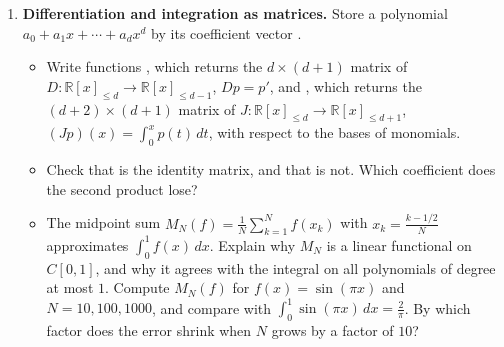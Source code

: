 \begin{enumerate}[label=\textbf{P\arabic*.}, leftmargin=*]
    \item \textbf{Differentiation and integration as matrices.} Store a polynomial $a_0 + a_1x + \cdots + a_dx^d$ by its coefficient vector .
    \begin{itemize}
        \item Write functions , which returns the $d \times (d + 1)$ matrix of $D: \mathbb{R}[x]_{\leq d} \to \mathbb{R}[x]_{\leq d-1}$, $Dp = p'$, and , which returns the $(d + 2) \times (d + 1)$ matrix of $J: \mathbb{R}[x]_{\leq d} \to \mathbb{R}[x]_{\leq d+1}$, $(Jp)(x) = \int_0^x p(t)\, dt$, with respect to the bases of monomials.
        \item Check that  is the identity matrix, and that  is not. Which coefficient does the second product lose?
        \item The midpoint sum $M_N(f) = \frac{1}{N}\sum_{k=1}^N f(x_k)$ with $x_k = \frac{k - 1/2}{N}$ approximates $\int_0^1 f(x)\, dx$. Explain why $M_N$ is a linear functional on $C[0, 1]$, and why it agrees with the integral on all polynomials of degree at most $1$. Compute $M_N(f)$ for $f(x) = \sin(\pi x)$ and $N = 10, 100, 1000$, and compare with $\int_0^1 \sin(\pi x)\, dx = \frac{2}{\pi}$. By which factor does the error shrink when $N$ grows by a factor of $10$?
    \end{itemize}


\end{enumerate}
